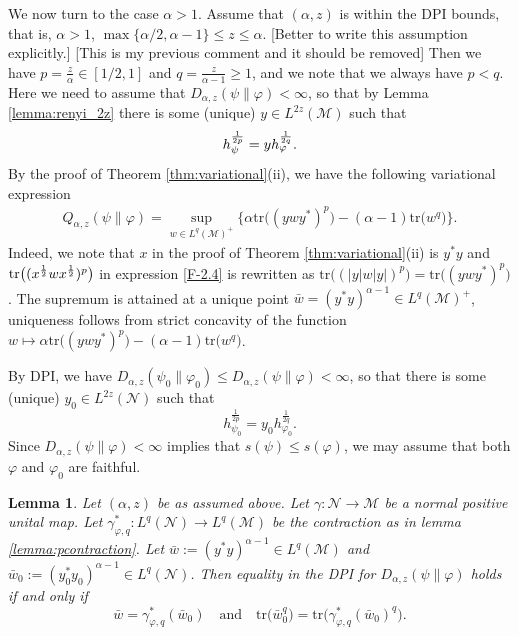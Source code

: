\documentclass[12pt]{article}
\newtheorem{lemma}[theorem]{Lemma}
\theoremstyle{definition}
\theoremstyle{remark}
\numberwithin{equation}{section}
\def\Me{\mathcal M}
\def\Ne{\mathcal N}
\def\Tr{\mathrm{tr}}
\def\ffi{\varphi}
\begin{document}
We now turn to the case $\alpha>1$. Assume that $(\alpha,z)$ is within the DPI bounds,
that is, $\alpha>1$, $\max\{\alpha/2,\alpha-1\}\le z\le\alpha$. [Better to write this assumption explicitly.]
{\color{blue}[This is my previous comment and it should be removed]} Then
we have $p=\frac z\alpha\in [1/2,1]$ and $q=\frac z{\alpha-1}\ge 1$, and we note that we always have $p<q$.
Here we need to assume that $D_{\alpha,z}(\psi\|\ffi)<\infty$, so that by Lemma \ref{lemma:renyi_2z}
there is some (unique) $y\in L^{2z}(\Me)$ such that
\[
h_{\psi}^{1\over 2p}=y h_\ffi^{1\over 2q}.
\]
By the proof of {\color{red}Theorem \ref{thm:variational}(ii)}, we have the following variational expression
\begin{align}\label{eq:variationalq}
Q_{\alpha,z}(\psi\|\varphi) =\sup_{w\in
L^q(\Me)^+}\bigl\{\alpha\Tr\bigl((ywy^*)^p\bigr)-(\alpha-1)\Tr\bigl(w^q\bigr)\bigr\}.
\end{align}
Indeed, we note that $x$ in the proof of {\color{red}Theorem \ref{thm:variational}(ii)} is $y^*y$ and
$\Tr\bigl((x^{1\over2}wx^{1\over2})^p\bigr)$ in expression \eqref{F-2.4} is rewritten as
$\Tr\bigl((|y|w|y|)^p\bigr)=\Tr\bigl((ywy^*)^p\bigr)$.
The supremum is attained at a unique point $\bar
w=(y^*y)^{\alpha-1}\in L^q(\Me)^+$, uniqueness follows from strict concavity of the
function $w\mapsto \alpha\Tr\bigl((ywy^*)^p\bigr)-(\alpha-1)\Tr\bigl( w^q\bigr)$.


By DPI, we have $D_{\alpha,z}(\psi_0\|\varphi_0)\le D_{\alpha,z}(\psi\|\varphi)<\infty$,
so that there is some (unique) $y_0\in L^{2z}(\Ne)$ such that 
\[
h_{\psi_0}^{\frac1{2p}}=y_0h_{\varphi_0}^{\frac1{2q}}.
\]
Since $D_{\alpha,z}(\psi\|\ffi)<\infty$ implies that $s(\psi)\le s(\ffi)$, we may assume that both $\ffi$ and
$\ffi_0$ are faithful.


\begin{lemma}\label{lemma:le}
Let $(\alpha,z)$ be as assumed above. Let $\gamma:\Ne\to\Me$ be a normal positive unital map. 
Let $\gamma^*_{\ffi,q}:L^q(\Ne)\to L^q(\Me)$ be the contraction as in lemma \ref{lemma:pcontraction}. 
Let $\bar w:=(y^*y)^{\alpha-1}\in L^q(\Me)$ and $\bar w_0:=(y_0^*y_0)^{\alpha-1}\in
L^q(\Ne)$. Then equality in the DPI for $D_{\alpha,z}(\psi\|\ffi)$ holds if and only if
\begin{equation}\label{eq:dpiw}
\bar w=\gamma^*_{\ffi,q}(\bar w_0)\quad \text{and}\quad  
\Tr\bigl(\bar w_0^q\bigr)=\Tr\bigl(\gamma^*_{\varphi,q}(\bar w_0)^q\bigr).
\end{equation}
\end{lemma}
\end{document}
